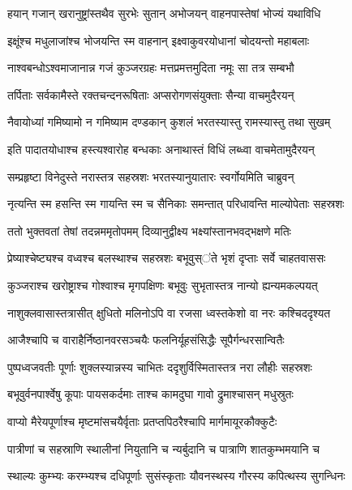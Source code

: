 \twolineshloka
{हयान् गजान् खरानुष्ट्रांस्तथैव सुरभेः सुतान्}
{अभोजयन् वाहनपास्तेषां भोज्यं यथाविधि} %

\twolineshloka
{इक्षूंश्च मधुलाजांश्च भोजयन्ति स्म वाहनान्}
{इक्ष्वाकुवरयोधानां चोदयन्तो महाबलाः} %

\twolineshloka
{नाश्वबन्धोऽश्वमाजानान्न गजं कुञ्जरग्रहः}
{मत्तप्रमत्तमुदिता नमूः सा तत्र सम्बभौ} %

\twolineshloka
{तर्पिताः सर्वकामैस्ते रक्तचन्दनरूषिताः}
{अप्सरोगणसंयुक्ताः सैन्या वाचमुदैरयन्} %

\twolineshloka
{नैवायोध्यां गमिष्यामो न गमिष्याम दण्डकान्}
{कुशलं भरतस्यास्तु रामस्यास्तु तथा सुखम्} %

\twolineshloka
{इति पादातयोधाश्च हस्त्यश्वारोह बन्धकाः}
{अनाथास्तं विधिं लब्ध्वा वाचमेतामुदैरयन्} %

\twolineshloka
{सम्प्रहृष्टा विनेदुस्ते नरास्तत्र सहस्रशः}
{भरतस्यानुयातारः स्वर्गोयमिति चाब्रुवन्} %

\twolineshloka
{नृत्यन्ति स्म हसन्ति स्म गायन्ति स्म च सैनिकाः}
{समन्तात् परिधावन्ति माल्योपेताः सहस्रशः} %

\twolineshloka
{ततो भुक्तवतां तेषां तदन्नममृतोपमम्}
{दिव्यानुद्वीक्ष्य भक्ष्यांस्तानभवद्भक्षणे मतिः} %

\twolineshloka
{प्रेष्याश्चेष्ट्यश्च वध्वश्च बलस्थाश्च सहस्रशः}
{बभूवुस्ऺते भृशं दृप्ताः सर्वे चाहतवाससः} %

\twolineshloka
{कुञ्जराश्च खरोष्ट्राश्च गोश्वाश्च मृगपक्षिणः}
{बभूवुः सुभृतास्तत्र नान्यो ह्यन्यमकल्पयत्} %

\twolineshloka
{नाशुक्लवासास्तत्रासीत् क्षुधितो मलिनोऽपि वा}
{रजसा ध्वस्तकेशो वा नरः कश्चिददृश्यत} %

\twolineshloka
{आजैश्चापि च वाराहैर्निष्ठानवरसञ्चयैः}
{फलनिर्यूहसंसिद्धैः सूपैर्गन्धरसान्वितैः} %

\twolineshloka
{पुष्पध्वजवतीः पूर्णाः शुक्लस्यान्नस्य चाभितः}
{ददृशुर्विस्मितास्तत्र नरा लौहीः सहस्रशः} %

\twolineshloka
{बभूवुर्वनपार्श्वेषु कूपाः पायसकर्दमाः}
{ताश्च कामदुघा गावो द्रुमाश्चासन् मधुस्रुतः} %

\twolineshloka
{वाप्यो मैरेयपूर्णाश्च मृष्टमांसचयैर्वृताः}
{प्रतप्तपिठरैश्चापि मार्गमायूरकौक्कुटैः} %

\twolineshloka
{पात्रीणां च सहस्राणि स्थालीनां नियुतानि च}
{न्यर्बुदानि च पात्राणि शातकुम्भमयानि च} %

\twolineshloka
{स्थाल्यः कुम्भ्यः करम्भ्यश्च दधिपूर्णाः सुसंस्कृताः}
{यौवनस्थस्य गौरस्य कपित्थस्य सुगन्धिनः} %

